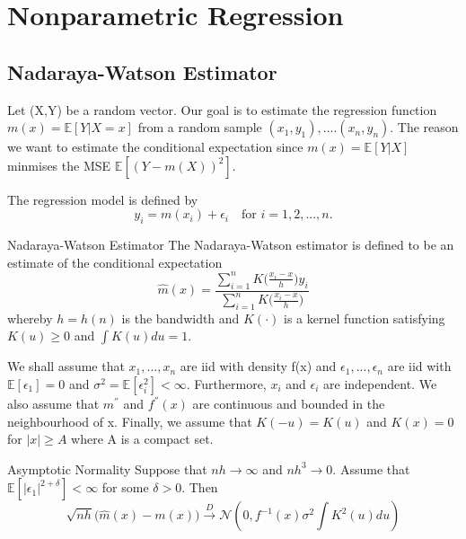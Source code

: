 \documentclass[twoside]{article}
\begin{document}
\section{Nonparametric Regression}
\subsection{Nadaraya-Watson Estimator}

Let (X,Y) be a random vector. Our goal is to estimate the regression function $m(x) = \mathbb{E}[Y|X=x]$ from a random sample $(x_1,y_1),....(x_n,y_n)$. The reason we want to estimate the conditional expectation since $m(x) = \mathbb{E}[Y|X]$ minmises the MSE $\mathbb{E}[(Y - m(X))^2].$


The regression model is defined by 
\begin{equation}
y_i = m(x_i) + \epsilon_i \quad \text{for } i=1,2,...,n.
\end{equation}

\begin{definition_exam}{Nadaraya-Watson Estimator}{} The Nadaraya-Watson estimator is defined to be an estimate of the conditional expectation 
\begin{equation}
\hat{m}(x) = \frac{\sum_{i=1}^{n}K\big(\frac{x_i - x}{h}\big)y_i}{\sum_{i=1}^{n}K\big(\frac{x_i - x}{h}\big)}
\end{equation}
whereby $h = h(n)$ is the bandwidth and $K(\cdot)$ is a kernel function satisfying $K(u) \geq 0$ and $\int K(u)du = 1.$
\end{definition_exam}


We shall assume that $x_1, ..., x_n$ are iid with density f(x) and $\epsilon_1, ..., \epsilon_n$ are iid with $\mathbb{E}[\epsilon_1] = 0$ and $\sigma^2 = \mathbb{E}[\epsilon_i^2] < \infty$. Furthermore, $x_i$ and $\epsilon_i$ are independent. We also assume that $m^{''}$ and $f^{''}(x)$ are continuous and bounded in the neighbourhood of x. Finally, we assume that $K(-u) = K(u)$ and $K(x) = 0$ for $|x| \geq A$ where A is a compact set.

\begin{proposition_exam}{Asymptotic Normality}{} Suppose that $nh \rightarrow \infty$ and $nh^3 \rightarrow 0$. Assume that $\mathbb{E}[|\epsilon_{1}|^{2 + \delta}] < \infty$ for some $\delta > 0.$ Then 
\begin{equation}
  \sqrt{nh}\big(\hat{m}(x) - m(x) \big) \xrightarrow{D} \mathcal{N}(0, f^{-1}(x)\sigma^2\int K^2(u)du)
\end{equation}
\end{proposition_exam}
\end{document}
